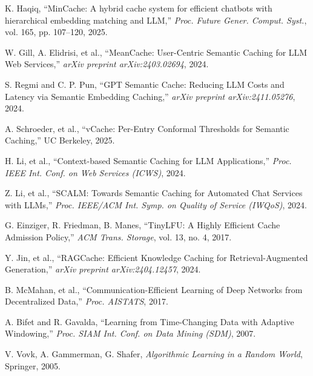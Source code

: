 \documentclass[12pt,a4paper]{report}
\begin{document}
\begin{enumerate}[label={[\arabic*]}, leftmargin=1.5cm]
\item K. Haqiq, ``MinCache: A hybrid cache system for efficient chatbots with hierarchical embedding matching and LLM,'' \textit{Proc. Future Gener. Comput. Syst.}, vol. 165, pp. 107--120, 2025.

\item W. Gill, A. Elidrisi, et al., ``MeanCache: User-Centric Semantic Caching for LLM Web Services,'' \textit{arXiv preprint arXiv:2403.02694}, 2024.

\item S. Regmi and C. P. Pun, ``GPT Semantic Cache: Reducing LLM Costs and Latency via Semantic Embedding Caching,'' \textit{arXiv preprint arXiv:2411.05276}, 2024.

\item A. Schroeder, et al., ``vCache: Per-Entry Conformal Thresholds for Semantic Caching,'' UC Berkeley, 2025.

\item H. Li, et al., ``Context-based Semantic Caching for LLM Applications,'' \textit{Proc. IEEE Int. Conf. on Web Services (ICWS)}, 2024.

\item Z. Li, et al., ``SCALM: Towards Semantic Caching for Automated Chat Services with LLMs,'' \textit{Proc. IEEE/ACM Int. Symp. on Quality of Service (IWQoS)}, 2024.

\item G. Einziger, R. Friedman, B. Manes, ``TinyLFU: A Highly Efficient Cache Admission Policy,'' \textit{ACM Trans. Storage}, vol. 13, no. 4, 2017.

\item Y. Jin, et al., ``RAGCache: Efficient Knowledge Caching for Retrieval-Augmented Generation,'' \textit{arXiv preprint arXiv:2404.12457}, 2024.

\item B. McMahan, et al., ``Communication-Efficient Learning of Deep Networks from Decentralized Data,'' \textit{Proc. AISTATS}, 2017.

\item A. Bifet and R. Gavalda, ``Learning from Time-Changing Data with Adaptive Windowing,'' \textit{Proc. SIAM Int. Conf. on Data Mining (SDM)}, 2007.

\item V. Vovk, A. Gammerman, G. Shafer, \textit{Algorithmic Learning in a Random World}, Springer, 2005.


\end{enumerate}
\end{document}
